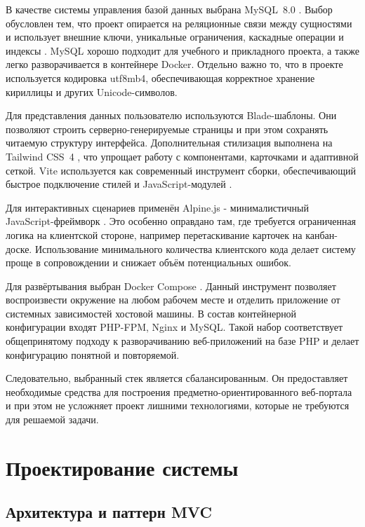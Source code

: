 \documentclass[14pt,a4paper]{extreport}
\begin{document}
В качестве системы управления базой данных выбрана MySQL~8.0 \cite{mysqldoc}.
Выбор обусловлен тем, что проект опирается на реляционные связи между
сущностями и использует внешние ключи, уникальные ограничения, каскадные
операции и индексы \cite{date}.
MySQL хорошо подходит для учебного и прикладного проекта, а также легко
разворачивается в контейнере Docker.
Отдельно важно то, что в проекте используется кодировка utf8mb4,
обеспечивающая корректное хранение кириллицы и других Unicode-символов.

Для представления данных пользователю используются Blade-шаблоны.
Они позволяют строить серверно-генерируемые страницы и при этом сохранять
читаемую структуру интерфейса.
Дополнительная стилизация выполнена на Tailwind CSS~4 \cite{tailwinddoc},
что упрощает работу с компонентами, карточками и адаптивной сеткой.
Vite используется как современный инструмент сборки, обеспечивающий быстрое
подключение стилей и JavaScript-модулей \cite{vitedoc}.

Для интерактивных сценариев применён Alpine.js - минималистичный
JavaScript-фреймворк \cite{js}\cite{alpinedoc}.
Это особенно оправдано там, где требуется ограниченная логика на клиентской
стороне, например перетаскивание карточек на канбан-доске.
Использование минимального количества клиентского кода делает систему проще
в сопровождении и снижает объём потенциальных ошибок.

Для развёртывания выбран Docker Compose \cite{dockerdoc}.
Данный инструмент позволяет воспроизвести окружение на любом рабочем месте
и отделить приложение от системных зависимостей хостовой машины.
В состав контейнерной конфигурации входят PHP-FPM, Nginx и MySQL.
Такой набор соответствует общепринятому подходу к разворачиванию
веб-приложений на базе PHP и делает конфигурацию понятной и повторяемой.

Следовательно, выбранный стек является сбалансированным.
Он предоставляет необходимые средства для построения предметно-ориентированного
веб-портала и при этом не усложняет проект лишними технологиями, которые не
требуются для решаемой задачи.

\newpage
\chapter[Глава \thechapter. Проектирование системы]{Проектирование системы}

\section{Архитектура и паттерн MVC}
\end{document}
